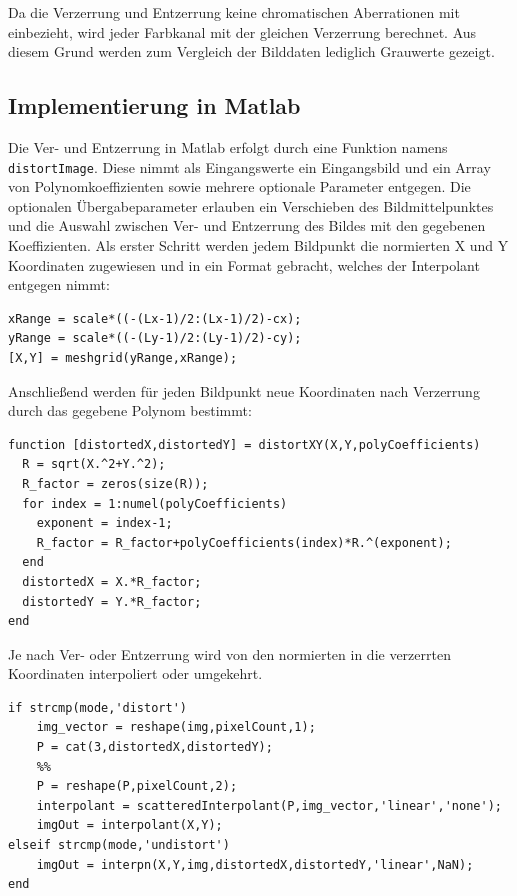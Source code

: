 Da die Verzerrung und Entzerrung keine chromatischen Aberrationen mit einbezieht, wird jeder Farbkanal mit der gleichen Verzerrung berechnet. Aus diesem Grund werden zum Vergleich der Bilddaten lediglich Grauwerte gezeigt.

\subsection{Implementierung in Matlab}
Die Ver- und Entzerrung in Matlab erfolgt durch eine Funktion namens \texttt{distortImage}. Diese nimmt als Eingangswerte ein Eingangsbild und ein Array von Polynomkoeffizienten sowie mehrere optionale Parameter entgegen. Die optionalen Übergabeparameter erlauben ein Verschieben des Bildmittelpunktes und die Auswahl zwischen Ver- und Entzerrung des Bildes mit den gegebenen Koeffizienten. 
Als erster Schritt werden jedem Bildpunkt die normierten X und Y Koordinaten zugewiesen und in ein Format gebracht, welches der Interpolant entgegen nimmt:
\begin{lstlisting}[style=Matlab-editor,basicstyle=\mlttfamily]
%% Bestimmung der normierten X und Y-Koordinaten mit Center-Offset
xRange = scale*((-(Lx-1)/2:(Lx-1)/2)-cx);
yRange = scale*((-(Ly-1)/2:(Ly-1)/2)-cy);
[X,Y] = meshgrid(yRange,xRange);
\end{lstlisting}
Anschließend werden für jeden Bildpunkt neue Koordinaten nach Verzerrung durch das gegebene Polynom bestimmt:
\begin{lstlisting}[style=Matlab-editor,basicstyle=\mlttfamily]
%% Berechne das Verzerrungspolynom und verzerrte XY Coordinaten
function [distortedX,distortedY] = distortXY(X,Y,polyCoefficients)
  R = sqrt(X.^2+Y.^2);
  R_factor = zeros(size(R));
  for index = 1:numel(polyCoefficients)
    exponent = index-1;
    R_factor = R_factor+polyCoefficients(index)*R.^(exponent);
  end
  distortedX = X.*R_factor;
  distortedY = Y.*R_factor;
end
\end{lstlisting}
Je nach Ver- oder Entzerrung wird von den normierten in die verzerrten Koordinaten interpoliert oder umgekehrt.
\begin{lstlisting}[style=Matlab-editor,basicstyle=\mlttfamily]
%% Berechnung der X,Y Position nach Ver/Entzerrung
if strcmp(mode,'distort')
	img_vector = reshape(img,pixelCount,1);
	P = cat(3,distortedX,distortedY);
	%%
	P = reshape(P,pixelCount,2);
	interpolant = scatteredInterpolant(P,img_vector,'linear','none');
	imgOut = interpolant(X,Y);
elseif strcmp(mode,'undistort')
	imgOut = interpn(X,Y,img,distortedX,distortedY,'linear',NaN);
end
\end{lstlisting}


